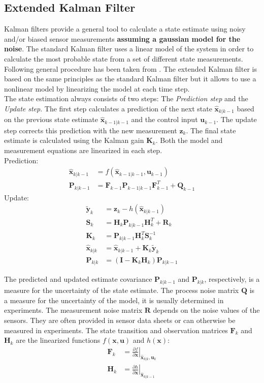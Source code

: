 \subsection{Extended Kalman Filter}
Kalman filters provide a general tool to calculate a state estimate using noisy and/or biased sensor measurements {\bfseries{assuming a gaussian model for the noise}}. The standard Kalman filter uses a linear model of the system in order to calculate the most probable state from a set of different state measurements.\\
Following general procedure has been taken from \cite{Bar-Shalom}.
The extended Kalman filter is based on the same principles as the standard Kalman filter but it allows to use a nonlinear model by linearizing the model at each time step.\\
The state estimation always consists of two steps: The \emph{Prediction step} and the \emph{Update step}. The first step calculates a prediction of the next state $\hat{\bm{x}}_{k|k-1}$ based on the previous state estimate $\hat{\bm{x}}_{k-1|k-1}$ and the control input $\bm{u}_{k-1}$. The update step corrects this prediction with the new measurement $\bm{z}_k$. The final state estimate is calculated using the Kalman gain $\bm{K}_k$. Both the model and measurement equations are linearized in each step.\\
Prediction:
\begin{align}
\hat{\bm{x}}_{k|k-1} &= f(\hat{\bm{x}}_{k-1|k-1},\bm{u}_{k-1})\\
\bm{P}_{k|k-1} &= \bm{F}_{k-1} \bm{P}_{k-1|k-1} \bm{F}_{k-1}^T + \bm{Q}_{k-1}
\end{align}
Update:
\begin{align}
\tilde{\bm{y}}_k &= \bm{z}_k - h(\hat{\bm{x}}_{k|k-1})\\
\bm{S}_k &= \bm{H}_k \bm{P}_{k|k-1} \bm{H}_k^T + \bm{R}_k\\
\bm{K}_k &= \bm{P}_{k|k-1}\bm{H}_k^T \bm{S}_k^{-1}\\
\hat{\bm{x}}_{k|k} &= \hat{\bm{x}}_{k|k-1} + \bm{K}_k \tilde{\bm{y}}_k\\
\bm{P}_{k|k} &= (\bm{I}-\bm{K}_k \bm{H}_k)\bm{P}_{k|k-1}
\end{align}

The predicted and updated estimate covariance $\bm{P}_{k|k-1}$ and $\bm{P}_{k|k}$, respectively, is a measure for the uncertainty of the state estimate. The process noise matrix $\bm{Q}$ is a measure for the uncertainty of the model, it is usually determined in experiments. The measurement noise matrix $\bm{R}$ depends on the noise values of the sensors. They are often provided in sensor data sheets or can otherwise be measured in experiments. The state transition and observation matrices $\bm F_k$ and $\bm{H}_k$ are the linearized functions $f(\bm{x},\bm{u})$ and $h(\bm{x})$:
\begin{align}
\bm{F}_k &= \left. \frac{\partial f}{\partial \bm{x}} \right|_{\hat{\bm{x}}_{k|k},\bm{u}_k}\\
\bm{H}_k &= \left. \frac{\partial h}{\partial \bm{x}} \right|_{\hat{\bm{x}}_{k|k-1}}
\end{align}
